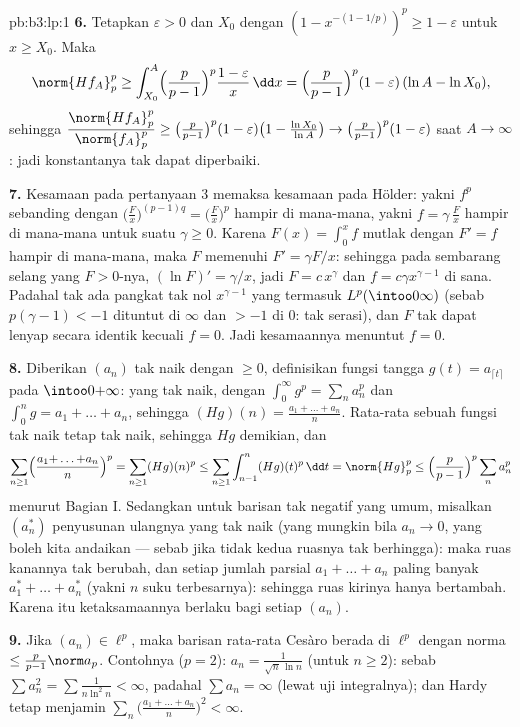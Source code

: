 \begin{solution}{pb:b3:lp:1}
\textbf{6.} Tetapkan $\varepsilon > 0$ dan $X_0$ dengan $(1 -
x^{-(1-1/p)})^p \geq 1 - \varepsilon$ untuk $x \geq X_0$. Maka
\[
\norm{Hf_A}_p^p \geq \int_{X_0}^A\Bigl(\frac
p{p-1}\Bigr)^p\frac{1 - \varepsilon}{x}\,\dd x
= \Bigl(\frac p{p-1}\Bigr)^p(1 - \varepsilon)\,(\ln A - \ln
X_0),
\]
sehingga $\dfrac{\norm{Hf_A}_p^p}{\norm{f_A}_p^p} \geq \bigl(\frac
p{p-1}\bigr)^p(1 - \varepsilon)\bigl(1 - \frac{\ln X_0}{\ln
A}\bigr) \to \bigl(\frac p{p-1}\bigr)^p(1 - \varepsilon)$ saat
$A \to \infty$: jadi konstantanya tak dapat diperbaiki.

\textbf{7.} Kesamaan pada pertanyaan 3 memaksa kesamaan pada
Hölder: yakni $f^p$ sebanding dengan $\bigl(\frac Fx\bigr)^{(p-1)q}
= \bigl(\frac Fx\bigr)^p$ hampir di mana-mana, yakni $f = \gamma\,\frac Fx$
hampir di mana-mana untuk suatu $\gamma \geq 0$. Karena $F(x) = \int_0^xf$
 mutlak dengan $F' = f$ hampir di mana-mana, maka $F$ memenuhi $F' =
\gamma F/x$: sehingga pada sembarang selang yang $F > 0$-nya, $(\ln F)' =
\gamma/x$, jadi $F = c\,x^{\gamma}$ dan $f = c\gamma
x^{\gamma - 1}$ di sana. Padahal tak ada pangkat tak nol $x^{\gamma-1}$ yang
termasuk $L^p(\intoo0\infty)$ (sebab $p(\gamma - 1) < -1$ dituntut
di $\infty$ dan $> -1$ di $0$: tak serasi), dan $F$ tak dapat
lenyap secara identik kecuali $f = 0$. Jadi kesamaannya menuntut $f =
0$.

\textbf{8.} Diberikan $(a_n)$ tak naik dengan $\geq 0$, definisikan
fungsi tangga $g(t) = a_{\lceil t\rceil}$ pada
$\intoo0{+\infty}$: yang tak naik, dengan $\int_0^\infty g^p =
\sum_na_n^p$ dan $\int_0^ng = a_1 + \dots + a_n$, sehingga
$(Hg)(n) = \frac{a_1 + \dots + a_n}n$. Rata-rata sebuah fungsi
tak naik tetap tak naik, sehingga $Hg$ demikian, dan
\[
\sum_{n\geq1}\Bigl(\frac{a_1{+}\dots{+}a_n}n\Bigr)^p
= \sum_{n\geq1}(Hg)(n)^p
\leq \sum_{n\geq1}\int_{n-1}^n (Hg)(t)^p\,\dd t
= \norm{Hg}_p^p
\leq \Bigl(\frac p{p-1}\Bigr)^p\sum_n a_n^p
\]
menurut Bagian I. Sedangkan untuk barisan tak negatif yang umum, misalkan $(a_n^*)$
penyusunan ulangnya yang tak naik (yang mungkin bila $a_n \to 0$,
yang boleh kita andaikan --- sebab jika tidak kedua ruasnya tak berhingga):
maka ruas kanannya tak berubah, dan setiap jumlah parsial $a_1 + \dots
+ a_n$ paling banyak $a_1^* + \dots + a_n^*$ (yakni $n$ suku terbesarnya): sehingga
ruas kirinya hanya bertambah. Karena itu ketaksamaannya berlaku bagi setiap
$(a_n)$.

\textbf{9.} Jika $(a_n) \in \ell^p$, maka barisan rata-rata Cesàro
berada di $\ell^p$ dengan norma $\leq \frac p{p-1}\norm
a_p$. Contohnya ($p = 2$): $a_n = \frac1{\sqrt n\,\ln n}$ (untuk $n
\geq 2$): sebab $\sum a_n^2 = \sum\frac1{n\ln^2n} < \infty$, padahal
$\sum a_n = \infty$ (lewat uji integralnya); dan Hardy tetap menjamin
$\sum_n\bigl(\frac{a_1 + \dots + a_n}n\bigr)^2 < \infty$.


\end{solution}
